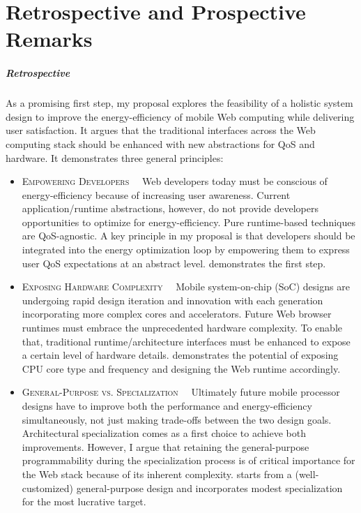 
\chapter{Retrospective and Prospective Remarks}
\label{sec:conc}

\paragraph{Retrospective} As a promising first step, my proposal explores the feasibility of a holistic system design to improve the energy-efficiency of mobile Web computing while delivering user satisfaction. It argues that the traditional interfaces across the Web computing stack should be enhanced with new abstractions for QoS and hardware. It demonstrates three general principles:

\begin{itemize}
  \item \textsc{Empowering Developers~~} Web developers today must be conscious of energy-efficiency because of increasing user awareness. Current application/runtime abstractions, however, do not provide developers opportunities to optimize for energy-efficiency. Pure runtime-based techniques are QoS-agnostic. A key principle in my proposal is that developers should be integrated into the energy optimization loop by empowering them to express user QoS expectations at an abstract level. \greenweb demonstrates the first step.
  
  \item \textsc{Exposing Hardware Complexity~~} Mobile system-on-chip (SoC) designs are undergoing rapid design iteration and innovation with each generation incorporating more complex cores and accelerators. Future Web browser runtimes must embrace the unprecedented hardware complexity. To enable that, traditional runtime/architecture interfaces must be enhanced to expose a certain level of hardware details. \webrt demonstrates the potential of exposing CPU core type and frequency and designing the Web runtime accordingly.
  
  \item \textsc{General-Purpose vs. Specialization~~} Ultimately future mobile processor designs have to improve both the performance and energy-efficiency simultaneously, not just making trade-offs between the two design goals. Architectural specialization comes as a first choice to achieve both improvements. However, I argue that retaining the general-purpose programmability during the specialization process is of critical importance for the Web stack because of its inherent complexity. \webcore starts from a (well-customized) general-purpose design and incorporates modest specialization for the most lucrative target.
\end{itemize}

